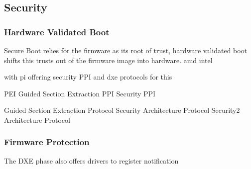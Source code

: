 
\subsection{Security}

\subsubsection{Hardware Validated Boot}
Secure Boot relies for the firmware as its root of trust, hardware validated boot shifts this trusts out of the firmware image into hardware.
amd
intel

with pi offering security PPI and dxe protocols for this

PEI Guided Section Extraction PPI
Security PPI

Guided Section Extraction Protocol
Security Architecture Protocol
Security2 Architecture Protocol


\subsubsection{Firmware Protection}

The \ac{DXE} phase also offers drivers to register notification




